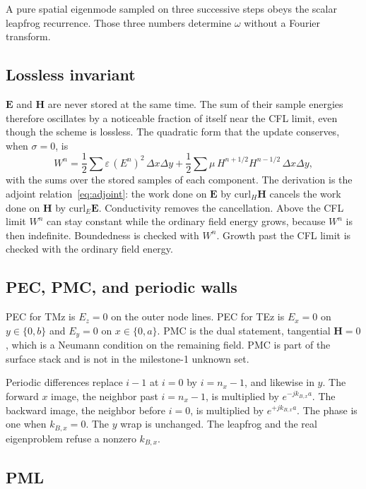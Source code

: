 \documentclass[11pt,a4paper]{article}
\numberwithin{equation}{section}
\begin{document}
A pure spatial eigenmode sampled on three successive steps obeys the scalar
leapfrog recurrence. Those three numbers determine $\omega$ without a
Fourier transform.

\subsection{Lossless invariant}
\label{sec:invariant}

$\mathbf{E}$ and $\mathbf{H}$ are never stored at the same time. The sum of
their sample energies therefore oscillates by a noticeable fraction of itself
near the CFL limit, even though the scheme is lossless. The quadratic form
that the update conserves, when $\sigma=0$, is
\begin{equation}
W^n
=
\frac12\sum \varepsilon\,(E^n)^2\,\Delta x\Delta y
+
\frac12\sum \mu\, H^{n+1/2} H^{n-1/2}\,\Delta x\Delta y,
\label{eq:invariant}
\end{equation}
with the sums over the stored samples of each component. The derivation is the
adjoint relation~\eqref{eq:adjoint}: the work done on $\mathbf{E}$ by
$\mathrm{curl}_H\mathbf{H}$ cancels the work done on $\mathbf{H}$ by
$\mathrm{curl}_E\mathbf{E}$. Conductivity removes the cancellation. Above the
CFL limit $W^n$ can stay constant while the ordinary field energy grows,
because $W^n$ is then indefinite. Boundedness is checked with $W^n$. Growth
past the CFL limit is checked with the ordinary field energy.

\subsection{PEC, PMC, and periodic walls}
\label{sec:walls}

PEC for TMz is $E_z=0$ on the outer node lines. PEC for TEz is $E_x=0$ on
$y\in\{0,b\}$ and $E_y=0$ on $x\in\{0,a\}$. PMC is the dual statement,
tangential $\mathbf{H}=0$, which is a Neumann condition on the remaining
field. PMC is part of the surface stack and is not in the milestone-1
unknown set.

Periodic differences replace $i-1$ at $i=0$ by $i=n_x-1$, and likewise in $y$.
The forward $x$ image, the neighbor past $i=n_x-1$, is multiplied by
$e^{-j k_{B,x} a}$. The backward image, the neighbor before $i=0$, is
multiplied by $e^{+j k_{B,x} a}$. The phase is one when $k_{B,x}=0$. The $y$
wrap is unchanged. The leapfrog and the real eigenproblem refuse a nonzero
$k_{B,x}$.

\subsection{PML}
\label{sec:pml}
\end{document}
